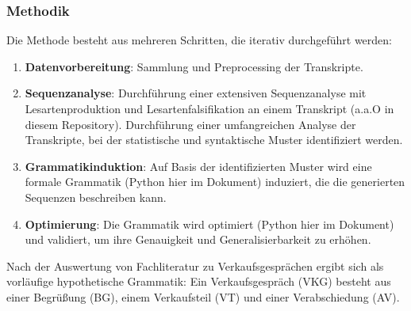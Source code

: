\documentclass[
]{article}
\begin{document}
\subsubsection{Methodik}\label{methodik}

Die Methode besteht aus mehreren Schritten, die iterativ durchgeführt
werden:

\begin{enumerate}
\def\labelenumi{\arabic{enumi}.}
\item
  \textbf{Datenvorbereitung}: Sammlung und Preprocessing der
  Transkripte.
\item
  \textbf{Sequenzanalyse}: Durchführung einer extensiven Sequenzanalyse
  mit Lesartenproduktion und Lesartenfalsifikation an einem Transkript
  (a.a.O in diesem Repository). Durchführung einer umfangreichen Analyse
  der Transkripte, bei der statistische und syntaktische Muster
  identifiziert werden.
\item
  \textbf{Grammatikinduktion}: Auf Basis der identifizierten Muster wird
  eine formale Grammatik (Python hier im Dokument) induziert, die die
  generierten Sequenzen beschreiben kann.
\item
  \textbf{Optimierung}: Die Grammatik wird optimiert (Python hier im
  Dokument) und validiert, um ihre Genauigkeit und Generalisierbarkeit
  zu erhöhen.
\end{enumerate}

Nach der Auswertung von Fachliteratur zu Verkaufsgesprächen ergibt sich
als vorläufige hypothetische Grammatik: Ein Verkaufsgespräch (VKG)
besteht aus einer Begrüßung (BG), einem Verkaufsteil (VT) und einer
Verabschiedung (AV).
\end{document}
